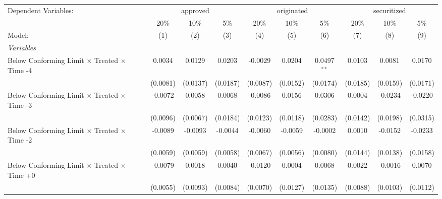 \begingroup
\centering
\begin{tabular}{lccccccccc}
   \tabularnewline \midrule \midrule
   Dependent Variables: & \multicolumn{3}{c}{approved} & \multicolumn{3}{c}{originated} & \multicolumn{3}{c}{securitized}\\
                                                              & 20\%           & 10\%           & 5\%            & 20\%          & 10\%           & 5\%           & 20\%         & 10\%          & 5\% \\    
   Model:                                                     & (1)            & (2)            & (3)            & (4)           & (5)            & (6)           & (7)          & (8)           & (9)\\  
   \midrule
   \emph{Variables}\\
   Below Conforming Limit  $\times$ Treated $\times$ Time -4  & 0.0034         & 0.0129         & 0.0203         & -0.0029       & 0.0204         & 0.0497$^{**}$ & 0.0103       & 0.0081        & 0.0170\\   
                                                              & (0.0081)       & (0.0137)       & (0.0187)       & (0.0087)      & (0.0152)       & (0.0174)      & (0.0185)     & (0.0159)      & (0.0171)\\   
   Below Conforming Limit $\times$ Treated $\times$ Time -3   & -0.0072        & 0.0058         & 0.0068         & -0.0086       & 0.0156         & 0.0306        & 0.0004       & -0.0234       & -0.0220\\   
                                                              & (0.0096)       & (0.0067)       & (0.0184)       & (0.0123)      & (0.0118)       & (0.0283)      & (0.0142)     & (0.0198)      & (0.0315)\\   
   Below Conforming Limit $\times$ Treated $\times$ Time -2   & -0.0089        & -0.0093        & -0.0044        & -0.0060       & -0.0059        & -0.0002       & 0.0010       & -0.0152       & -0.0233\\   
                                                              & (0.0059)       & (0.0059)       & (0.0058)       & (0.0067)      & (0.0056)       & (0.0080)      & (0.0144)     & (0.0138)      & (0.0158)\\   
   Below Conforming Limit $\times$ Treated $\times$ Time +0   & -0.0079        & 0.0018         & 0.0040         & -0.0120       & 0.0004         & 0.0068        & 0.0022       & -0.0016       & 0.0070\\   
                                                              & (0.0055)       & (0.0093)       & (0.0084)       & (0.0070)      & (0.0127)       & (0.0135)      & (0.0088)     & (0.0103)      & (0.0112)\\   

\end{tabular}
